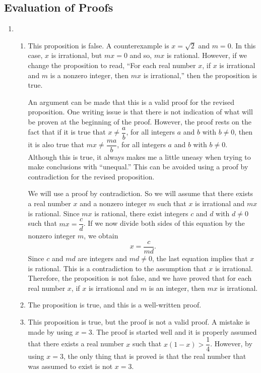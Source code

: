 \subsection*{Evaluation of Proofs}
\setcounter{oldenumi}{\theenumi}
\begin{enumerate} \setcounter{enumi}{\theoldenumi}
\item \begin{enumerate}

\item This proposition is false.  A counterexample is $x = \sqrt{2}$ and $m = 0$.  In this case, $x$ is irrational, but $mx = 0$ and so, $mx$ is rational.  However, if we change the proposition to read, ``For each real number $x$, if $x$ is irrational and $m$ is a nonzero integer, then $mx$ is irrational,'' then the proposition is true.  

An argument can be made that this is a valid proof for the revised proposition.  One writing issue is that there is not indication of what will be proven at the beginning of the proof.  However, the proof rests on the fact that if it is true that $x \ne \dfrac{a}{b}$, for all integers $a$ and $b$ with $b \ne 0$, then it is also true that $mx \ne \dfrac{ma}{b}$, for all integers $a$ and $b$ with $b \ne 0$.  Although this is true, it always makes me a little uneasy when trying to make conclusions with ``unequal.''  This can be avoided using a proof by contradiction for the revised proposition.

\begin{myproof}
We will use a proof by contradiction.  So we will assume that there exists a real number $x$ and a nonzero integer $m$ such that $x$ is irrational and $mx$ is rational.  Since $mx$ is rational, there exist integers $c$ and $d$ with $d \ne 0$ such that $mx = \dfrac{c}{d}$.  If we now divide both sides of this equation by the nonzero integer $m$, we obtain
\[
x = \frac{c}{md}.
\]
Since $c$ and $md$ are integers and $md \ne 0$, the last equation implies that $x$ is rational.  This is a contradiction to the assumption that $x$ is irrational.  Therefore, the proposition is not false, and we have proved that for each real number $x$, if $x$ is irrational and $m$ is an integer, then $mx$ is irrational.
\end{myproof}


\item The proposition is true, and this is a well-written proof.


\item This proposition is true, but the proof is not a valid proof.  A mistake is made by using $x = 3$.  The proof is started well and it is properly assumed that there exists a real number $x$ such that $x(1 - x) > \dfrac{1}{4}$.  However, by using $x = 3$, the only thing that is proved is that the real number that was assumed to exist is not $x = 3$.  


\end{enumerate}
\end{enumerate}
